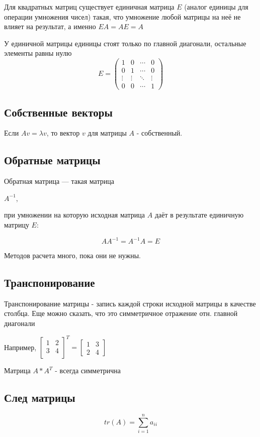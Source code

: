 \documentclass{article}
\begin{document}
Для квадратных матриц существует единичная матрица $E$ (аналог единицы для операции умножения чисел) такая,
что умножение любой матрицы на неё не влияет на результат, а именно $EA=AE=A$

У единичной матрицы единицы стоят только по главной диагонали, остальные элементы равны нулю
$$E=\begin{pmatrix}1&0&\cdots &0\\0&1&\cdots &0\\\vdots &\vdots &\ddots &\vdots \\0&0&\cdots &1\end{pmatrix}$$

\subsection*{Собственные векторы}

Если $Av = \lambda v$, то вектор $v$ для матрицы $A$ - собственный.

\subsection*{Обратные матрицы}
Обратная матрица — такая матрица 

$A^{-1}$, 

при умножении на которую исходная матрица $A$ 
даёт в результате единичную матрицу $E$:

$$AA^{-1}=A^{-1}A=E$$

Методов расчета много, пока они не нужны.

\subsection*{Транспонирование}

Транспонирование матрицы - запись каждой строки исходной матрицы в качестве столбца. Еще можно сказать, что это симметричное отражение отн. главной диагонали

Например,
$\begin{bmatrix}
1 & 2 \\
3 & 4 \\
\end{bmatrix}^{T} =\begin{bmatrix}1&3\\2&4\end{bmatrix}$

Матрица $A*A^T$ - всегда симметрична


\subsection*{След матрицы}
$$tr(A) = \sum_{i=1}^na_{ii}$$
\end{document}
